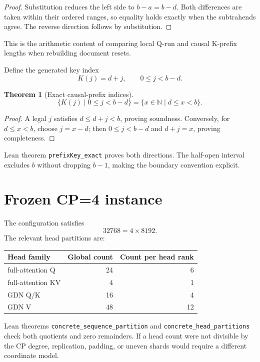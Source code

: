 \documentclass[11pt,a4paper]{article}
\newtheorem{theorem}{Theorem}
\begin{document}
\begin{proof}
Substitution reduces the left side to $b-a=b-d$. Both differences are taken within their ordered ranges, so equality holds exactly when the subtrahends agree. The reverse direction follows by substitution.
\end{proof}

This is the arithmetic content of comparing local Q-run and causal K-prefix lengths when rebuilding document resets.

Define the generated key index
\[
K(j)=d+j,\qquad 0\le j<b-d. \tag{9}
\]

\begin{theorem}[Exact causal-prefix indices]
\[
\{K(j)\mid0\le j<b-d\}
=\{x\in\mathbb N\mid d\le x<b\}. \tag{10}
\]
\end{theorem}

\begin{proof}
A legal $j$ satisfies $d\le d+j<b$, proving soundness. Conversely, for $d\le x<b$, choose $j=x-d$; then $0\le j<b-d$ and $d+j=x$, proving completeness.
\end{proof}

Lean theorem \texttt{prefixKey\_exact} proves both directions. The half-open interval excludes $b$ without dropping $b-1$, making the boundary convention explicit.

\section{Frozen CP=4 instance}

The configuration satisfies
\[
32768=4\times8192.
\]
The relevant head partitions are:

\begin{center}
\begin{tabular}{lrr}
\toprule
Head family & Global count & Count per head rank \\
\midrule
full-attention Q & 24 & 6 \\
full-attention KV & 4 & 1 \\
GDN Q/K & 16 & 4 \\
GDN V & 48 & 12 \\
\bottomrule
\end{tabular}
\end{center}

Lean theorems \texttt{concrete\_sequence\_partition} and \texttt{concrete\_head\_partitions} check both quotients and zero remainders. If a head count were not divisible by the CP degree, replication, padding, or uneven shards would require a different coordinate model.
\end{document}
